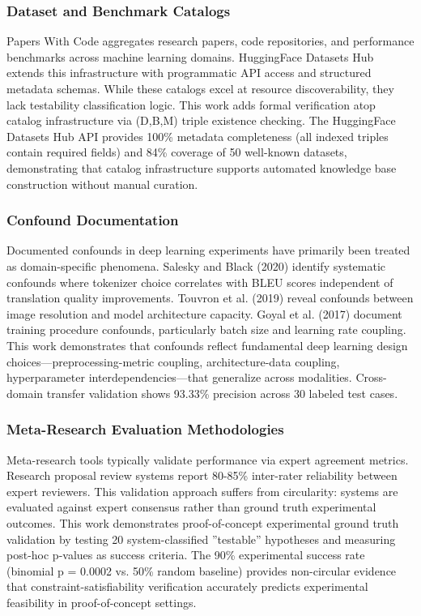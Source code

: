 
\subsubsection{Dataset and Benchmark Catalogs}

Papers With Code aggregates research papers, code repositories, and performance benchmarks across machine learning domains. HuggingFace Datasets Hub extends this infrastructure with programmatic API access and structured metadata schemas. While these catalogs excel at resource discoverability, they lack testability classification logic. This work adds formal verification atop catalog infrastructure via (D,B,M) triple existence checking. The HuggingFace Datasets Hub API provides 100\% metadata completeness (all indexed triples contain required fields) and 84\% coverage of 50 well-known datasets, demonstrating that catalog infrastructure supports automated knowledge base construction without manual curation.

\subsubsection{Confound Documentation}

Documented confounds in deep learning experiments have primarily been treated as domain-specific phenomena. Salesky and Black (2020) identify systematic confounds where tokenizer choice correlates with BLEU scores independent of translation quality improvements. Touvron et al. (2019) reveal confounds between image resolution and model architecture capacity. Goyal et al. (2017) document training procedure confounds, particularly batch size and learning rate coupling. This work demonstrates that confounds reflect fundamental deep learning design choices---preprocessing-metric coupling, architecture-data coupling, hyperparameter interdependencies---that generalize across modalities. Cross-domain transfer validation shows 93.33\% precision across 30 labeled test cases.

\subsubsection{Meta-Research Evaluation Methodologies}

Meta-research tools typically validate performance via expert agreement metrics. Research proposal review systems report 80-85\% inter-rater reliability between expert reviewers. This validation approach suffers from circularity: systems are evaluated against expert consensus rather than ground truth experimental outcomes. This work demonstrates proof-of-concept experimental ground truth validation by testing 20 system-classified ''testable'' hypotheses and measuring post-hoc p-values as success criteria. The 90\% experimental success rate (binomial p = 0.0002 vs. 50\% random baseline) provides non-circular evidence that constraint-satisfiability verification accurately predicts experimental feasibility in proof-of-concept settings.
